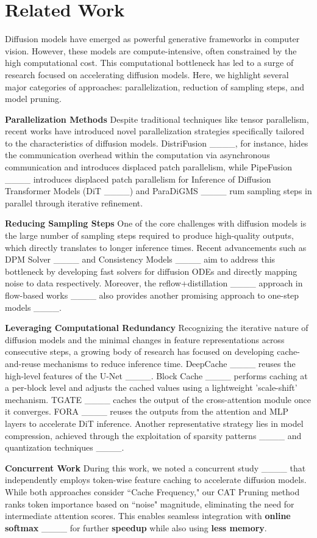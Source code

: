 \section{Related Work}
Diffusion models have emerged as powerful generative frameworks in computer vision. However, these models are compute-intensive, often constrained by the high computational cost. This computational bottleneck has led to a surge of research focused on accelerating diffusion models. Here, we highlight several major categories of approaches: parallelization, reduction of sampling steps, and model pruning.

\textbf{Parallelization Methods}
 Despite traditional techniques like tensor parallelism, recent works have introduced novel parallelization strategies specifically tailored to the characteristics of diffusion models. DistriFusion ____, for instance, hides the communication overhead within the computation via asynchronous communication and introduces displaced patch parallelism, while PipeFusion ____ introduces displaced patch parallelism for Inference of Diffusion Transformer Models (DiT ____) and ParaDiGMS ____ rum sampling steps in parallel through iterative refinement.

\textbf{Reducing Sampling Steps}
One of the core challenges with diffusion models is the large number of sampling steps required to produce high-quality outputs, which directly translates to longer inference times. Recent advancements such as DPM Solver ____ and Consistency Models ____ aim to address this bottleneck by developing fast solvers for diffusion ODEs and directly mapping noise to data respectively.  Moreover, the reflow+distillation ____ approach in flow-based works ____ also provides another promising approach to one-step models ____.

\textbf{Leveraging Computational Redundancy} %
Recognizing the iterative nature of diffusion models and the minimal changes in feature representations across consecutive steps, a growing body of research has focused on developing cache-and-reuse mechanisms to reduce inference time. DeepCache ____ reuses the high-level features of the U-Net ____. Block Cache ____ performs caching at a per-block level and adjusts the cached values using a lightweight 'scale-shift' mechanism. TGATE ____ caches the output of the cross-attention module once it converges. FORA ____ reuses the outputs from the attention and MLP layers to accelerate DiT inference. Another representative strategy lies in model compression, achieved through the exploitation of sparsity patterns ____ and quantization techniques ____.

\textbf{Concurrent Work}
During this work, we noted a concurrent study ____ that independently employs token-wise feature caching to accelerate diffusion models. While both approaches consider ``Cache Frequency," our CAT Pruning method ranks token importance based on ``noise" magnitude, eliminating the need for intermediate attention scores. This enables seamless integration with \textbf{online softmax} ____ for further \textbf{speedup} while also using \textbf{less memory}.